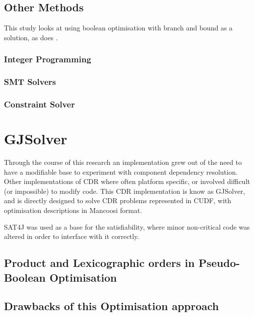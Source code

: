 \subsection{Other Methods}
This \cite{Stuckenholz2007} study looks at using boolean optimisation with branch and bound as a solution, as does \cite{Jenson2010a}.


\subsubsection{Integer Programming}
\subsubsection{SMT Solvers}
\subsubsection{Constraint Solver}


\section{GJSolver}
Through the course of this research an implementation grew out of the need to have a modifiable base to experiment with component dependency resolution.
Other implementations of CDR where often platform specific, or involved difficult (or impossible) to modify code.
This CDR implementation is know as GJSolver, and is directly designed to solve CDR problems represented in CUDF, with optimisation descriptions in Mancoosi format.

SAT4J was used as a base for the satisfiability, where minor non-critical code was altered in order to interface with it correctly.


\subsection{Product and Lexicographic orders in Pseudo-Boolean Optimisation}

\subsection{Drawbacks of this Optimisation approach}

